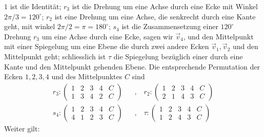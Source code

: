 $1$ ist die Identität; $r_3$ ist die Drehung um eine Achse durch eine Ecke
mit Winkel $2 \pi / 3 = 120^\circ$; $r_2$ ist eine Drehung um eine Achse, die
senkrecht durch eine Kante geht, mit winkel $2 \pi / 2 = \pi = 180^\circ$;
$s_4$ ist die Zusammensetzung einer $120^\circ$ Drehung $r_3$ um eine Achse
durch eine Ecke, sagen wir $\vec{v}_4$, und den Mittelpunkt mit einer Spiegelung
um eine Ebene die durch zwei andere Ecken $\vec{v}_1,\vec{v}_2$ und den
Mittelpunkt geht; schliesslich ist $\tau$ die Spiegelung bezüglich einer
durch eine Kante und den Mittelpunkt gehenden Ebene. Die entsprechende
Permutation der Ecken $1,2,3,4$ und des Mittelpunktes $C$ sind
\begin{align*}
    r_3 : \begin{pmatrix}
        1 & 2 & 3 & 4 & C \\ 1 & 3 & 4 & 2 & C
    \end{pmatrix}
    \hspace{10pt} &, \hspace{10pt}
    r_2 : \begin{pmatrix}
        1 & 2 & 3 & 4 & C \\ 2 & 1 & 4 & 3 & C
    \end{pmatrix}
    \\
    s_4 : \begin{pmatrix}
        1 & 2 & 3 & 4 & C \\ 4 & 1 & 2 & 3 & C
    \end{pmatrix}
    \hspace{10pt} &, \hspace{10pt}
    \tau : \begin{pmatrix}
        1 & 2 & 3 & 4 & C \\ 1 & 2 & 4 & 3 & C
    \end{pmatrix}
\end{align*}
Weiter gilt:
